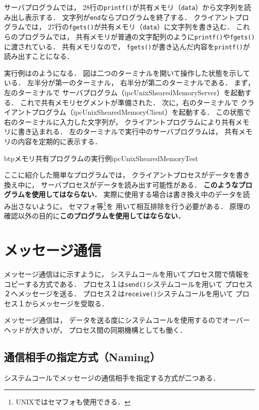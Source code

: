 サーバプログラムでは，
28行の{\tt printf()}が共有メモリ（{\tt data}）から文字列を読み出し表示する．
文字列が{\tt end}ならプログラムを終了する．
クライアントプログラムでは，
27行の{\tt fgets()}が共有メモリ（{\tt data}）に文字列を書き込む．
これらのプログラムでは，
共有メモリが普通の文字配列のように{\tt printf()}や{\tt fgets()}に渡されている．
共有メモリなので，
{\tt fgets()}が書き込んだ内容を{\tt printf()}が読み出すことになる．

実行例はのようになる．
図は二つのターミナルを開いて操作した状態を示している．
左半分が第一のターミナル，
右半分が第二のターミナルである．
まず，左のターミナルで
サーバプログラム（ipcUnixShearedMemoryServer）を起動する．
これで共有メモリセグメントが準備された．
次に，右のターミナルで
クライアントプログラム（ipcUnixShearedMemoryClient）を起動する．
この状態で右のターミナルに入力した文字列が，
クライアントプログラムにより共有メモリに書き込まれる．
左のターミナルで実行中のサーバプログラムは，
共有メモリの内容を定期的に表示する．

\begin{myfig}{btp}{メモリ共有プログラムの実行例}{ipcUnixShearedMemoryTest}

\end{myfig}

ここに紹介した簡単なプログラムでは，
クライアントプロセスがデータを書き換え中に，
サーバプロセスがデータを読み出す可能性がある．
{\bf このようなプログラムを使用してはならない．}
実際に使用する場合は書き換え中のデータを読み出さないように，
セマフォ等\footnote{UNIXではセマフォも使用できる．}を
用いて相互排除を行う必要がある．
原理の確認以外の目的に{\bf このプログラムを使用してはならない．}

\section{メッセージ通信}
メッセージ通信はに示すように，
システムコールを用いてプロセス間で情報をコピーする方式である．
プロセス１は{\tt send()}システムコールを用いて
プロセス２へメッセージを送る．
プロセス２は{\tt receive()}システムコールを用いて
プロセス１からメッセージを受取る．


メッセージ通信は，
データを送る度にシステムコールを使用するのでオーバーヘッドが大きいが，
プロセス間の同期機構としても働く．

\subsection{通信相手の指定方式（Naming）}
システムコールでメッセージの通信相手を指定する方式が二つある．

